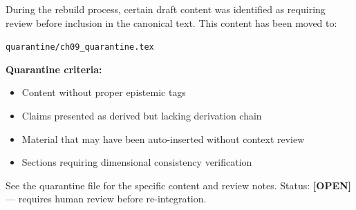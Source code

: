 \documentclass[11pt,a4paper]{book}
\theoremstyle{definition}
\theoremstyle{remark}
\begin{document}
During the rebuild process, certain draft content was identified as requiring
review before inclusion in the canonical text. This content has been moved to:

\begin{center}
\texttt{quarantine/ch09\_quarantine.tex}
\end{center}

\textbf{Quarantine criteria:}
\begin{itemize}
    \item Content without proper epistemic tags
    \item Claims presented as derived but lacking derivation chain
    \item Material that may have been auto-inserted without context review
    \item Sections requiring dimensional consistency verification
\end{itemize}

See the quarantine file for the specific content and review notes.
Status: \textbf{[OPEN]} --- requires human review before re-integration.







\end{document}
